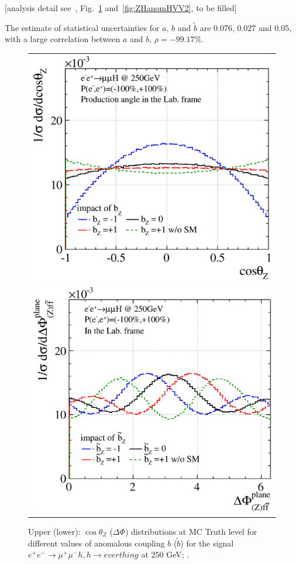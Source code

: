 [analysis detail see~\cite{Ogawa:2017bmg},
Fig.~\ref{fig:ZHanomHVV1} and~\ref{fig:ZHanomHVV2}, to be filled]

The estimate of statistical uncertainties for $a$, $b$ and $\tilde{b}$ are 
0.076, 0.027 and 0.05, with a large correlation between $a$ and $b$, $\rho=-99.17\%$.
\begin{figure}
\begin{tabular}[c]{c}
\includegraphics[width=0.85\hsize]{chapters/figures/ZH_anomHVV250_b.eps} \\
\includegraphics[width=0.85\hsize]{chapters/figures/ZH_anomHVV250_bt.eps} 
\end{tabular}
  \caption{Upper (lower): $\cos\theta_Z$ ($\Delta\Phi$) distributions at MC Truth level for different 
  values of anomalous coupling $b$ ($\tilde{b}$) 
  for the signal $e^+e^-\to \mu^+\mu^- h, h\to everthing$ at 250 GeV;
  \cite{anomHVV}.}
  \label{fig:ZHanomHVV1}
\end{figure}

